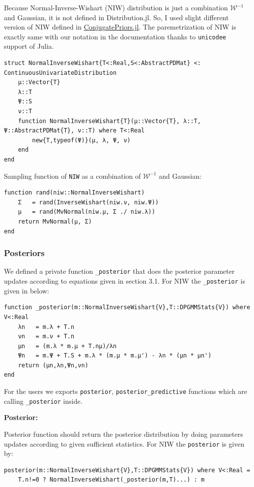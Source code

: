 \documentclass[a4paper]{article}
\begin{document}
Because Normal-Inverse-Wishart (NIW) distribution is just a combination
\(\mathcal{W}^{-1}\) and Gaussian, it is not defined in Distribution.jl.
So, I used slight different version of NIW defined in
\href{https://github.com/JuliaStats/ConjugatePriors.jl}{ConjugatePriors.jl}.
The paremetrization of NIW is exactly same with our notation in the
documentation thanks to \texttt{unicodee} support of Julia.
\begin{lstlisting}[linewidth=18cm]
struct NormalInverseWishart{T<:Real,S<:AbstractPDMat} <: ContinuousUnivariateDistribution
    μ::Vector{T}
    λ::T
    Ψ::S
    ν::T
    function NormalInverseWishart{T}(μ::Vector{T}, λ::T, Ψ::AbstractPDMat{T}, ν::T) where T<:Real
        new{T,typeof(Ψ)}(μ, λ, Ψ, ν)
    end
end
\end{lstlisting}
Sampling function of \texttt{NIW} as a combination of
\(\mathcal{W}^{-1}\) and Gaussian:

\begin{lstlisting}
function rand(niw::NormalInverseWishart)
    Σ   = rand(InverseWishart(niw.ν, niw.Ψ))
    μ   = rand(MvNormal(niw.μ, Σ ./ niw.λ))
    return MvNormal(μ, Σ)
end
\end{lstlisting}


\subsubsection{Posteriors}

We defined a private function \texttt{\_posterior} that does the
posterior parameter updates according to equations given in section 3.1.
For NIW the \texttt{\_posterior} is given in below:
\begin{lstlisting}
function _posterior(m::NormalInverseWishart{V},T::DPGMMStats{V}) where V<:Real
    λn   = m.λ + T.n
    νn   = m.ν + T.n
    μn   = (m.λ * m.μ + T.nμ)/λn
    Ψn   = m.Ψ + T.S + m.λ * (m.μ * m.μ') - λn * (μn * μn')
    return (μn,λn,Ψn,νn)
end
\end{lstlisting}


For the users we exports \texttt{posterior},
\texttt{posterior\_predictive} functions which are calling
\texttt{\_posterior} inside.

\textbf{Posterior:}

Posterior function should return the posterior distribution by doing
parameters updates according to given sufficient statistics. For NIW the
\texttt{posterior} is given by:
\begin{lstlisting}
posterior(m::NormalInverseWishart{V},T::DPGMMStats{V}) where V<:Real = 
	T.n!=0 ? NormalInverseWishart(_posterior(m,T)...) : m
\end{lstlisting}
\end{document}
